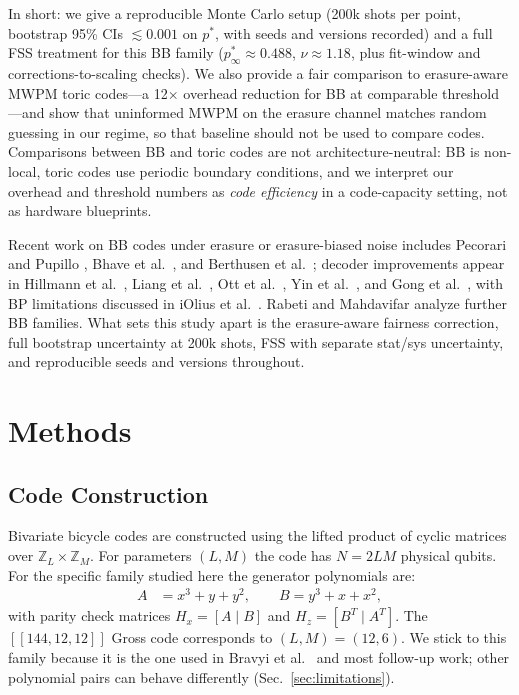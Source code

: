 \documentclass[twocolumn,10pt]{article}
\begin{document}
In short: we give a reproducible Monte Carlo setup (200k shots per point, bootstrap 95\%
CIs $\lesssim 0.001$ on $p^*$, with seeds and versions recorded) and a full FSS treatment
for this BB family ($p^*_\infty \approx 0.488$, $\nu \approx 1.18$, plus fit-window and
corrections-to-scaling checks).
We also provide a fair comparison to erasure-aware MWPM toric codes---a 12$\times$
overhead reduction for BB at comparable threshold---and show that uninformed MWPM on the
erasure channel matches random guessing in our regime, so that baseline should not be
used to compare codes.
Comparisons between BB and toric codes are not architecture-neutral: BB is non-local,
toric codes use periodic boundary conditions, and we interpret our overhead and threshold
numbers as \emph{code efficiency} in a code-capacity setting, not as hardware blueprints.

Recent work on BB codes under erasure or erasure-biased noise includes
Pecorari and Pupillo \cite{pecorari2025qldpc}, Bhave et al.\ \cite{bhave2026bibi}, and
Berthusen et al.\ \cite{berthusen2025local}; decoder improvements appear in
Hillmann et al.\ \cite{hillmann2025lsd}, Liang et al.\ \cite{liang2025bposd},
Ott et al.\ \cite{ott2025decision}, Yin et al.\ \cite{yin2024symmetry}, and
Gong et al.\ \cite{gong2024bpdecoding}, with BP limitations discussed in
iOlius et al.\ \cite{iolius2024bp}.
Rabeti and Mahdavifar \cite{rabeti2025bicycle} analyze further BB families.
What sets this study apart is the erasure-aware fairness correction, full bootstrap
uncertainty at 200k shots, FSS with separate stat/sys uncertainty, and reproducible
seeds and versions throughout.

\section{Methods}

\subsection{Code Construction}

Bivariate bicycle codes are constructed using the lifted product of cyclic matrices over
$\mathbb{Z}_L \times \mathbb{Z}_M$.
For parameters $(L, M)$ the code has $N = 2LM$ physical qubits.
For the specific family studied here the generator polynomials are:
\begin{align}
A &= x^3 + y + y^2, \qquad B = y^3 + x + x^2,
\end{align}
with parity check matrices $H_x = [A \mid B]$ and $H_z = [B^T \mid A^T]$.
The $[[144,12,12]]$ Gross code corresponds to $(L,M) = (12,6)$.
We stick to this family because it is the one used in Bravyi et al.\ \cite{bravyi2024high}
and most follow-up work; other polynomial pairs can behave differently
(Sec.~\ref{sec:limitations}).
\end{document}
